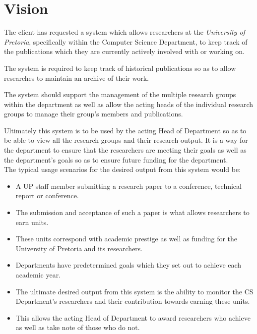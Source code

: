 \documentclass{article}
\begin{document}
	\cleardoublepage	
	\section{Vision}\label{sec:vision}
		The client has requested a system which allows researchers at the \textit{University of Pretoria}, specifically within the Computer Science Department, to keep track of the publications which they are currently actively involved with or working on.
		
		The system is required to keep track of historical publications so as to allow researches to maintain an archive of their work.
		
		The system should support the management of the multiple research groups within the department as well as allow the acting heads of the individual research groups to manage their group's members and publications.
		
		Ultimately this system is to be used by the acting Head of Department so as to be able to view all the research groups and their research output. It is a way for the department to ensure that the researchers are meeting their goals as well as the department's goals so as to ensure future funding for the department.\\
		[5mm]
		The typical usage scenarios for the desired output from this system would be:
		\begin{itemize}
			\item A UP staff member submitting a research paper to a conference, technical report or conference.
			\item The submission and acceptance of such a paper is what allows researchers to earn units.
			\item These units correspond with academic prestige as well as funding for the University of Pretoria and its researchers.
			\item Departments have predetermined goals which they set out to achieve each academic year.
			\item The ultimate desired output from this system is the ability to monitor the CS Department's researchers and their contribution towards earning these units.
			\item This allows the acting Head of Department to award researchers who achieve as well as take note of those who do not.
		\end{itemize}
	\cleardoublepage
\end{document}
